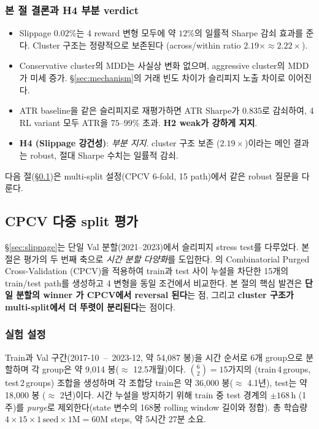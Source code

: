 \documentclass[11pt, a4paper]{article}
\begin{document}
\subsubsection{본 절 결론과 H4 부분 verdict}
\label{sec:slippage_conclusion}

\begin{itemize}[leftmargin=*]
\item Slippage $0.02\%$는 4 reward 변형 모두에 약 $12\%$의 일률적 Sharpe 감쇠
효과를 준다. Cluster 구조는 정량적으로 보존된다 (across/within ratio
$2.19\times \approx 2.22\times$).
\item Conservative cluster의 MDD는 사실상 변화 없으며, aggressive cluster의
MDD가 미세 증가. \S\ref{sec:mechanism}의 거래 빈도 차이가 슬리피지 노출 차이로
이어진다.
\item ATR baseline을 같은 슬리피지로 재평가하면 ATR Sharpe가 $0.835$로 감쇠하여,
4 RL variant 모두 ATR을 $75$--$99\%$ 초과. \textbf{H2 weak가 강하게 지지}.
\item \textbf{H4 (Slippage 강건성)}: \emph{부분 지지}. cluster 구조 보존
($2.19\times$)이라는 메인 결과는 robust, 절대 Sharpe 수치는 일률적 감쇠.
\end{itemize}

다음 절(\S\ref{sec:cpcv})은 multi-split 설정(CPCV 6-fold, 15 path)에서 같은
robust 질문을 다룬다.

\subsection{CPCV 다중 split 평가}
\label{sec:cpcv}

\S\ref{sec:slippage}는 단일 Val 분할(2021--2023)에서 슬리피지 stress test를
다루었다. 본 절은 평가의 두 번째 축으로 \emph{시간 분할 다양화}를 도입한다.
\citet{lopezdeprado2018advances}의 Combinatorial Purged Cross-Validation
(CPCV)을 적용하여 train과 test 사이 누설을 차단한 15개의 train/test path를
생성하고 4 변형을 동일 조건에서 비교한다. 본 절의 핵심 발견은
\textbf{단일 분할의 winner 가 CPCV에서 reversal 된다}는 점, 그리고
\textbf{cluster 구조가 multi-split에서 더 뚜렷이 분리된다}는 점이다.

\subsubsection{실험 설정}
\label{sec:cpcv_setup}

Train과 Val 구간(2017-10 \,--\, 2023-12, 약 54{,}087 봉)을 시간 순서로 6개
group으로 분할하며 각 group은 약 9{,}014 봉($\approx$ 12.5개월)이다.
$\binom{6}{2} = 15$가지의 (train\,4\,groups, test\,2\,groups) 조합을 생성하며
각 조합당 train은 약 36{,}000 봉($\approx$ 4.1년), test는 약 18{,}000 봉
($\approx$ 2년)이다. 시간 누설을 방지하기 위해 train 중 test 경계의
$\pm 168\,\mathrm{h}$ (1주)를 \emph{purge}로 제외한다(state 변수의 168봉
rolling window 길이와 정합). 총 학습량 $4 \times 15 \times 1\,\mathrm{seed} \times
1\mathrm{M} = 60$M steps, 약 5시간 27분 소요.
\end{document}

